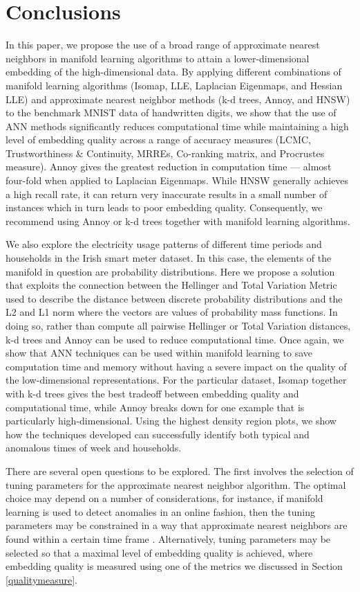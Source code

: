 \documentclass[11pt,a4paper,]{article}
\begin{document}
\hypertarget{conclusion}{%
\section{Conclusions}\label{conclusion}}

In this paper, we propose the use of a broad range of approximate nearest neighbors in manifold learning algorithms to attain a lower-dimensional embedding of the high-dimensional data. By applying different combinations of manifold learning algorithms (Isomap, LLE, Laplacian Eigenmaps, and Hessian LLE) and approximate nearest neighbor methods (k-d trees, Annoy, and HNSW) to the benchmark MNIST data of handwritten digits, we show that the use of ANN methods significantly reduces computational time while maintaining a high level of embedding quality across a range of accuracy measures (LCMC, Trustworthiness \& Continuity, MRREs, Co-ranking matrix, and Procrustes measure). Annoy gives the greatest reduction in computation time --- almost four-fold when applied to Laplacian Eigenmaps. While HNSW generally achieves a high recall rate, it can return very inaccurate results in a small number of instances which in turn leads to poor embedding quality. Consequently, we recommend using Annoy or k-d trees together with manifold learning algorithms.

We also explore the electricity usage patterns of different time periods and households in the Irish smart meter dataset. In this case, the elements of the manifold in question are probability distributions. Here we propose a solution that exploits the connection between the Hellinger and Total Variation Metric used to describe the distance between discrete probability distributions and the L2 and L1 norm where the vectors are values of probability mass functions. In doing so, rather than compute all pairwise Hellinger or Total Variation distances, k-d trees and Annoy can be used to reduce computational time.
Once again, we show that ANN techniques can be used within manifold learning to save computation time and memory without having a severe impact on the quality of the low-dimensional representations. For the particular dataset, Isomap together with k-d trees gives the best tradeoff between embedding quality and computational time, while Annoy breaks down for one example that is particularly high-dimensional. Using the highest density region plots, we show how the techniques developed can successfully identify both typical and anomalous times of week and households.

There are several open questions to be explored. The first involves the selection of tuning parameters for the approximate nearest neighbor algorithm. The optimal choice may depend on a number of considerations, for instance, if manifold learning is used to detect anomalies in an online fashion, then the tuning parameters may be constrained in a way that approximate nearest neighbors are found within a certain time frame \autocite{Talagala2020-ck}. Alternatively, tuning parameters may be selected so that a maximal level of embedding quality is achieved, where embedding quality is measured using one of the metrics we discussed in Section \ref{qualitymeasure}.
\end{document}
